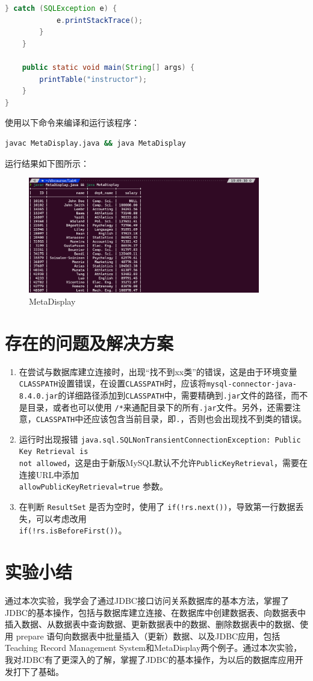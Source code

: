 \documentclass{article}
\renewcommand\tt{\texttt}
\begin{document}
\begin{lstlisting}[language=java]
        } catch (SQLException e) {
            e.printStackTrace();
        }
    }

    public static void main(String[] args) {
        printTable("instructor");
    }
}
\end{lstlisting}

使用以下命令来编译和运行该程序：

\begin{lstlisting}[language=bash]
javac MetaDisplay.java && java MetaDisplay
\end{lstlisting}

运行结果如下图所示：

\begin{figure}[H]
  \centering
  \includegraphics[width=0.9\textwidth]{img/14.png}
  \caption{MetaDisplay}
\end{figure}


\section{存在的问题及解决方案}

\begin{enumerate}
  \item 在尝试与数据库建立连接时，出现``找不到xx类''的错误，这是由于环境变量\tt{CLASSPATH}设置错误，在设置\tt{CLASSPATH}时，应该将\tt{mysql-connector-java-8.4.0.jar}的详细路径添加到\tt{CLASSPATH}中，需要精确到\tt{.jar}文件的路径，而不是目录，或者也可以使用 \tt{/*}来通配目录下的所有\tt{.jar}文件。另外，还需要注意，\tt{CLASSPATH}中还应该包含当前目录，即\tt{.}，否则也会出现找不到类的错误。
  \item 运行时出现报错 \tt{java.sql.SQLNonTransientConnectionException: Public Key Retrieval is \\not allowed}，这是由于新版MySQL默认不允许\tt{PublicKeyRetrieval}，需要在连接URL中添加\\ \tt{allowPublicKeyRetrieval=true} 参数。
  \item 在判断 \texttt{ResultSet} 是否为空时，使用了 \texttt{if(!rs.next())}，导致第一行数据丢失，可以考虑改用 \\ \texttt{if(!rs.isBeforeFirst())}。
\end{enumerate}


\section{实验小结}

通过本次实验，我学会了通过JDBC接口访问关系数据库的基本方法，掌握了JDBC的基本操作，包括与数据库建立连接、在数据库中创建数据表、向数据表中插入数据、从数据表中查询数据、更新数据表中的数据、删除数据表中的数据、使用 prepare 语句向数据表中批量插入（更新）数据、以及JDBC应用，包括Teaching Record Management System和MetaDisplay两个例子。通过本次实验，我对JDBC有了更深入的了解，掌握了JDBC的基本操作，为以后的数据库应用开发打下了基础。
\end{document}
